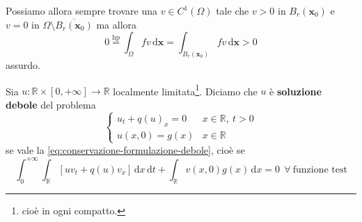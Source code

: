 \documentclass[10pt,a4paper,twoside,openright]{book}
\newcommand{\x}{\mathbf{x}}
\newcommand{\de}{\,\mathrm d}
\newcommand{\dx}{\de x}
\newcommand{\dt}{\de t}
\newcommand{\dxx}{\de \x}
\begin{document}
\begin{dimostrazione}
\begin{figure}[H]
    \end{figure}
    \FloatBarrier

    Possiamo allora sempre trovare una $v\in C^{1}(\Omega)$ tale che $v>0$ in $B_{r}(\x_{0})$ e $v=0$ in $\Omega \setminus \overline{B_{r}(\x_{0})}$ ma allora
    \begin{equation*}
        0 \overset{\text{hp}}{=} \int _{\Omega } fv\dxx=\int _{B_{r}(\x_{0})} fv\dxx >0
    \end{equation*}
    assurdo.
\end{dimostrazione}
\begin{definition}
     Sia $u:\mathbb{R} \times [ 0,+\infty ]\rightarrow \mathbb{R}$ localmente limitata\footnote{cioè in ogni compatto.}. Diciamo che $u$ è \textbf{soluzione debole} del problema
    \begin{equation*}
        \begin{cases}
            u_{t} +q(u)_{x} =0 & x\in \mathbb{R} ,\ t >0 \\
            u(x,0) =g(x)       & x\in \mathbb{R}
        \end{cases}
    \end{equation*}
    se vale la \eqref{eq:conservazione-formulazione-debole}, cioè se
    \begin{equation*}
        \int ^{+\infty }_{0}\int _{\mathbb{R}}[ uv_{t} +q(u) v_{x}] \dx\dt+\int _{\mathbb{R}} v(x,0) g(x) \dx=0\ \ \forall \ \text{funzione test}
    \end{equation*}
\end{definition}
\end{document}
